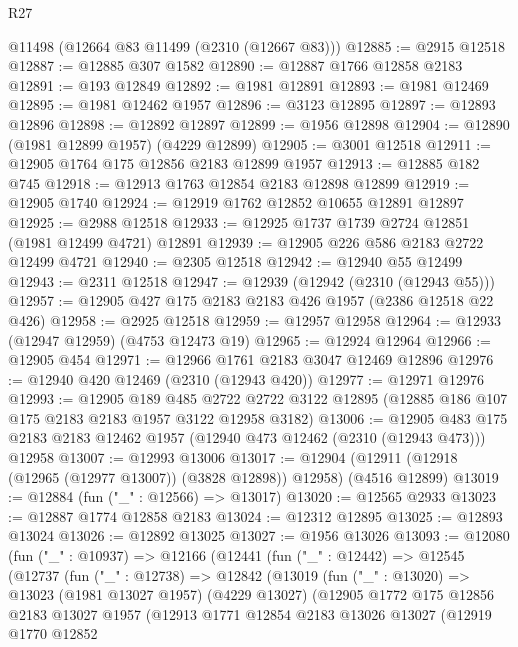\begin{lexlean}{R27}
\begin{coremodule}
    @11498
    (@12664 @83 @11499 (@2310 (@12667 @83)))
@12885 := @2915 @12518
@12887 := @12885 @307 @1582
@12890 := @12887 @1766 @12858 @2183
@12891 := @193 @12849
@12892 := @1981 @12891
@12893 := @1981 @12469
@12895 := @1981 @12462 @1957
@12896 := @3123 @12895
@12897 := @12893 @12896
@12898 := @12892 @12897
@12899 := @1956 @12898
@12904 := @12890 (@1981 @12899 @1957) (@4229 @12899)
@12905 := @3001 @12518
@12911 := @12905 @1764 @175 @12856 @2183 @12899 @1957
@12913 := @12885 @182 @745
@12918 := @12913 @1763 @12854 @2183 @12898 @12899
@12919 := @12905 @1740
@12924 := @12919 @1762 @12852 @10655 @12891 @12897
@12925 := @2988 @12518
@12933 := @12925 @1737 @1739 @2724 @12851 (@1981 @12499 @4721) @12891
@12939 := @12905 @226 @586 @2183 @2722 @12499 @4721
@12940 := @2305 @12518
@12942 := @12940 @55 @12499
@12943 := @2311 @12518
@12947 := @12939 (@12942 (@2310 (@12943 @55)))
@12957 := @12905 @427 @175 @2183 @2183 @426 @1957 (@2386 @12518 @22 @426)
@12958 := @2925 @12518
@12959 := @12957 @12958
@12964 := @12933 (@12947 @12959) (@4753 @12473 @19)
@12965 := @12924 @12964
@12966 := @12905 @454
@12971 := @12966 @1761 @2183 @3047 @12469 @12896
@12976 := @12940 @420 @12469 (@2310 (@12943 @420))
@12977 := @12971 @12976
@12993 := @12905
    @189
    @485
    @2722
    @2722
    @3122
    @12895
    (@12885 @186 @107 @175 @2183 @2183 @1957 @3122 @12958 @3182)
@13006 := @12905
    @483
    @175
    @2183
    @2183
    @12462
    @1957
    (@12940 @473 @12462 (@2310 (@12943 @473)))
    @12958
@13007 := @12993 @13006
@13017 := @12904 (@12911 (@12918 (@12965 (@12977 @13007)) (@3828 @12898)) @12958) (@4516 @12899)
@13019 := @12884 (fun ("_" : @12566) => @13017)
@13020 := @12565 @2933
@13023 := @12887 @1774 @12858 @2183
@13024 := @12312 @12895
@13025 := @12893 @13024
@13026 := @12892 @13025
@13027 := @1956 @13026
@13093 := @12080
    (fun ("_" : @10937) =>
    @12166
      (@12441
        (fun ("_" : @12442) =>
        @12545
          (@12737
            (fun ("_" : @12738) =>
            @12842
              (@13019
                (fun ("_" : @13020) =>
                @13023
                  (@1981 @13027 @1957)
                  (@4229 @13027)
                  (@12905
                    @1772
                    @175
                    @12856
                    @2183
                    @13027
                    @1957
                    (@12913
                      @1771
                      @12854
                      @2183
                      @13026
                      @13027
                      (@12919
                        @1770
                        @12852

\end{coremodule}
\end{lexlean}
